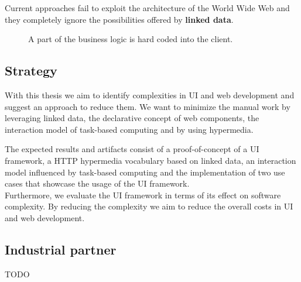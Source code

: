 Current approaches fail to exploit the architecture of the World Wide Web and they completely ignore the possibilities offered by \textbf{linked data}.

\begin{figure}[!htb]
  \caption{\label{fig:my-label} A part of the business logic is hard coded into the client.}
\end{figure}

\subsection{Strategy}\label{strategy}
With this thesis we aim to identify complexities in UI and web development and suggest an approach to reduce them.
We want to minimize the manual work by leveraging linked data, the declarative concept of web components, the interaction model of task-based computing and by using hypermedia.

The expected results and artifacts consist of a proof-of-concept of a UI framework, a HTTP hypermedia vocabulary based on linked data, an interaction model influenced by task-based computing and the implementation of two use cases that showcase the usage of the UI framework. \\
Furthermore, we evaluate the UI framework in terms of its effect on software complexity. By reducing the complexity we aim to reduce the overall costs in UI and web development.

\subsection{Industrial partner}
TODO
